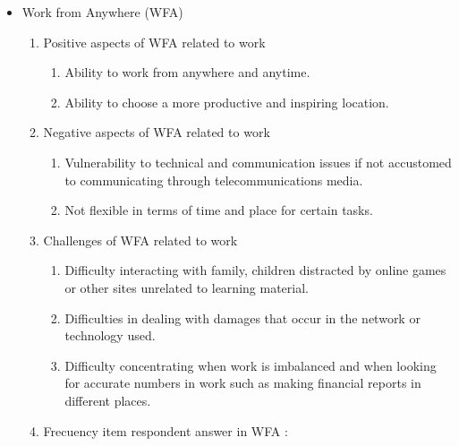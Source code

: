 \documentclass[conference]{IEEEtran}
\begin{document}
\begin{itemize}
\begin{enumerate}
\end{enumerate}
\item {Work from Anywhere (WFA)}
\begin{enumerate}
\item {Positive aspects of WFA related to work}
\begin{enumerate}
\item Ability to work from anywhere and anytime.
\item Ability to choose a more productive and inspiring location.
\end{enumerate}
\item {Negative aspects of WFA related to work}
\begin{enumerate}
\item Vulnerability to technical and communication issues if not accustomed to communicating through telecommunications media.
\item Not flexible in terms of time and place for certain tasks.
\end{enumerate}
\item Challenges of WFA related to work
\begin{enumerate}
\item Difficulty interacting with family, children distracted by online games or other sites unrelated to learning material.
\item Difficulties in dealing with damages that occur in the network or technology used.
\item Difficulty concentrating when work is imbalanced and when looking for accurate numbers in work such as making financial reports in different places.
\end{enumerate}
\item Frecuency item respondent answer in WFA :

\centering
{} \label{tab:title} 


\end{enumerate}
\end{itemize}
\end{document}
